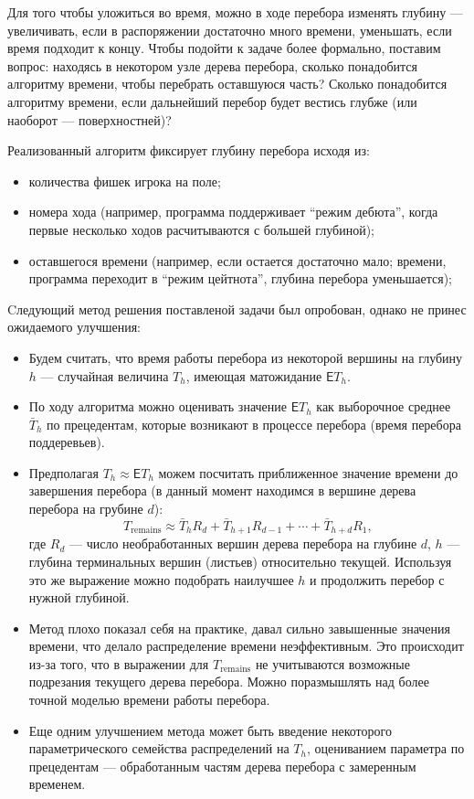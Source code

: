\documentclass[a4paper]{article}
\begin{document}
Для того чтобы уложиться во время, можно в ходе перебора изменять глубину --- увеличивать, если в распоряжении достаточно много времени, уменьшать, если время подходит к концу. Чтобы подойти к задаче более формально, поставим вопрос: находясь в некотором узле дерева перебора, сколько понадобится алгоритму времени, чтобы перебрать оставшуюся часть? Сколько понадобится алгоритму времени, если дальнейший перебор будет вестись глубже (или наоборот --- поверхностней)?

Реализованный алгоритм фиксирует глубину перебора исходя из:
\begin{itemize}
\item количества фишек игрока на поле;
\item номера хода (например, программа поддерживает ``режим дебюта'', когда первые несколько ходов расчитываются с большей глубиной);
\item оставшегося времени (например, если остается достаточно мало; времени, программа переходит в ``режим цейтнота'', глубина перебора уменьшается);
\end{itemize}

Cледующий метод решения поставленой задачи был опробован, однако не принес ожидаемого улучшения: 
\begin{itemize}
\item Будем считать, что время работы перебора из некоторой вершины на глубину $h$ --- случайная величина $T_h$, имеющая матожидание $\mathsf{E}T_h$.
\item По ходу алгоритма можно оценивать значение $\mathsf{E}T_h$ как выборочное среднее $\bar T_h$ по прецедентам, которые возникают в процессе перебора (время перебора поддеревьев).
\item Предполагая $T_h \approx \mathsf{E}T_h$ можем посчитать приближенное значение времени до завершения перебора (в данный момент находимся в вершине дерева перебора на грубине $d$): 
$$T_\text{remains} \approx \bar{T}_h R_d + \bar{T}_{h+1} R_{d-1} + \cdots + \bar{T}_{h+d} R_{1},$$
где $R_d$ --- число необработанных вершин дерева перебора на глубине $d$, $h$ --- глубина терминальных вершин (листьев) относительно текущей. Используя это же выражение можно подобрать наилучшее $h$ и продолжить перебор с нужной глубиной.
\item Метод плохо показал себя на практике, давал сильно завышенные значения времени, что делало распределение времени неэффективным. Это происходит из-за того, что в выражении для $T_\text{remains}$ не учитываются возможные подрезания текущего дерева перебора. Можно поразмышлять над более точной моделью времени работы перебора.
\item Еще одним улучшением метода может быть введение некоторого параметрического семейства распределений на $T_h$, оцениванием параметра по прецедентам --- обработанным частям дерева перебора с замеренным временем. 
\end{itemize}
\end{document}
